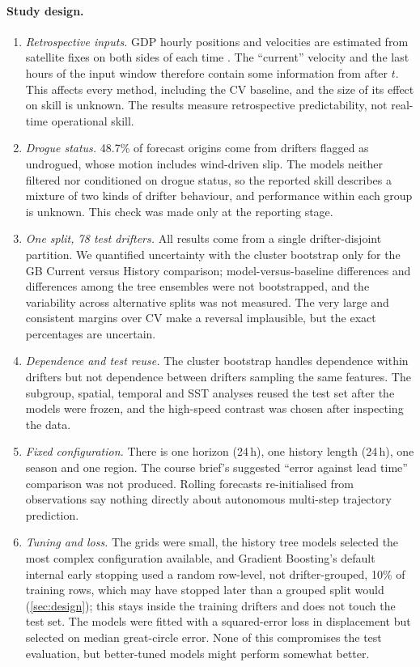 \paragraph{Study design.}
\begin{enumerate}[label=(\roman*)]
  \item \emph{Retrospective inputs.} GDP hourly positions and velocities are estimated from satellite fixes on both sides of each time \citep{elipot2016}. The ``current'' velocity and the last hours of the input window therefore contain some information from after $t$. This affects every method, including the CV baseline, and the size of its effect on skill is unknown. The results measure retrospective predictability, not real-time operational skill.
  \item \emph{Drogue status.} 48.7\% of forecast origins come from drifters flagged as undrogued, whose motion includes wind-driven slip. The models neither filtered nor conditioned on drogue status, so the reported skill describes a mixture of two kinds of drifter behaviour, and performance within each group is unknown. This check was made only at the reporting stage.
  \item \emph{One split, 78 test drifters.} All results come from a single drifter-disjoint partition. We quantified uncertainty with the cluster bootstrap only for the GB Current versus History comparison; model-versus-baseline differences and differences among the tree ensembles were not bootstrapped, and the variability across alternative splits was not measured. The very large and consistent margins over CV make a reversal implausible, but the exact percentages are uncertain.
  \item \emph{Dependence and test reuse.} The cluster bootstrap handles dependence within drifters but not dependence between drifters sampling the same features. The subgroup, spatial, temporal and SST analyses reused the test set after the models were frozen, and the high-speed contrast was chosen after inspecting the data.
  \item \emph{Fixed configuration.} There is one horizon (24\,h), one history length (24\,h), one season and one region. The course brief's suggested ``error against lead time'' comparison was not produced. Rolling forecasts re-initialised from observations say nothing directly about autonomous multi-step trajectory prediction.
  \item \emph{Tuning and loss.} The grids were small, the history tree models selected the most complex configuration available, and Gradient Boosting's default internal early stopping used a random row-level, not drifter-grouped, 10\% of training rows, which may have stopped later than a grouped split would (\cref{sec:design}); this stays inside the training drifters and does not touch the test set. The models were fitted with a squared-error loss in displacement but selected on median great-circle error. None of this compromises the test evaluation, but better-tuned models might perform somewhat better.

\end{enumerate}
